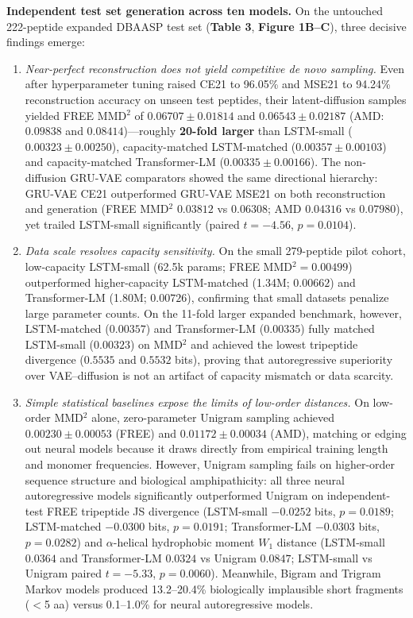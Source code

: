 \documentclass[unnumsec,webpdf,contemporary,large]{oup-authoring-template}
\newcommand{\rev}[1]{#1}
\begin{document}
\rev{\textbf{Independent test set generation across ten models.} On the untouched 222-peptide expanded DBAASP test set (\textbf{Table 3}, \textbf{Figure 1B--C}), three decisive findings emerge:
\begin{enumerate}
\item \textit{Near-perfect reconstruction does not yield competitive de novo sampling.} Even after hyperparameter tuning raised CE21 to 96.05\% and MSE21 to 94.24\% reconstruction accuracy on unseen test peptides, their latent-diffusion samples yielded FREE MMD$^2$ of $0.06707\pm 0.01814$ and $0.06543\pm 0.02187$ (AMD: $0.09838$ and $0.08414$)---roughly \textbf{20-fold larger} than LSTM-small ($0.00323\pm 0.00250$), capacity-matched LSTM-matched ($0.00357\pm 0.00103$) and capacity-matched Transformer-LM ($0.00335\pm 0.00166$). The non-diffusion GRU-VAE comparators showed the same directional hierarchy: GRU-VAE CE21 outperformed GRU-VAE MSE21 on both reconstruction and generation (FREE MMD$^2$ $0.03812$ vs $0.06308$; AMD $0.04316$ vs $0.07980$), yet trailed LSTM-small significantly (paired $t=-4.56$, $p=0.0104$).
\item \textit{Data scale resolves capacity sensitivity.} On the small 279-peptide pilot cohort, low-capacity LSTM-small (62.5k params; FREE MMD$^2=0.00499$) outperformed higher-capacity LSTM-matched (1.34M; $0.00662$) and Transformer-LM (1.80M; $0.00726$), confirming that small datasets penalize large parameter counts. On the 11-fold larger expanded benchmark, however, LSTM-matched ($0.00357$) and Transformer-LM ($0.00335$) fully matched LSTM-small ($0.00323$) on MMD$^2$ and achieved the lowest tripeptide divergence ($0.5535$ and $0.5532$ bits), proving that autoregressive superiority over VAE--diffusion is not an artifact of capacity mismatch or data scarcity.
\item \textit{Simple statistical baselines expose the limits of low-order distances.} On low-order MMD$^2$ alone, zero-parameter Unigram sampling achieved $0.00230\pm 0.00053$ (FREE) and $0.01172\pm 0.00034$ (AMD), matching or edging out neural models because it draws directly from empirical training length and monomer frequencies. However, Unigram sampling fails on higher-order sequence structure and biological amphipathicity: all three neural autoregressive models significantly outperformed Unigram on independent-test FREE tripeptide JS divergence (LSTM-small $-0.0252$ bits, $p=0.0189$; LSTM-matched $-0.0300$ bits, $p=0.0191$; Transformer-LM $-0.0303$ bits, $p=0.0282$) and $\alpha$-helical hydrophobic moment $W_1$ distance (LSTM-small $0.0364$ and Transformer-LM $0.0324$ vs Unigram $0.0847$; LSTM-small vs Unigram paired $t=-5.33$, $p=0.0060$). Meanwhile, Bigram and Trigram Markov models produced 13.2--20.4\% biologically implausible short fragments ($<$5 aa) versus 0.1--1.0\% for neural autoregressive models.
\end{enumerate}}
\end{document}
